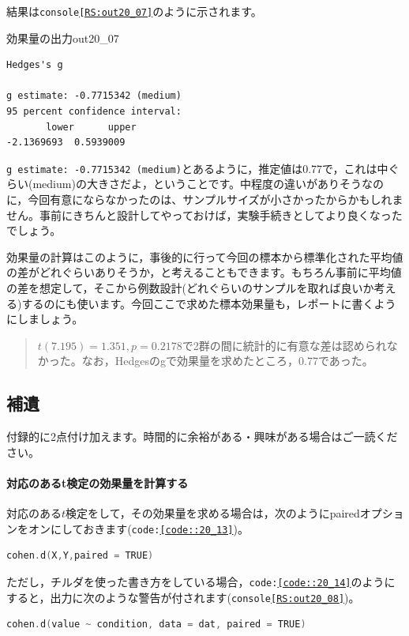 \documentclass{ltjsbook}
\begin{document}
結果は\texttt{console\ref{RS:out20_07}}のように示されます。
\begin{Rscreen}{効果量の出力}{out20_07}
\begin{verbatim}
Hedges's g

g estimate: -0.7715342 (medium)
95 percent confidence interval:
       lower      upper 
-2.1369693  0.5939009 
\end{verbatim}
\end{Rscreen}

\texttt{g estimate: -0.7715342 (medium)}とあるように，推定値は0.77で，これは中ぐらい(medium)の大きさだよ，ということです。中程度の違いがありそうなのに，今回有意にならなかったのは、サンプルサイズが小さかったからかもしれません。事前にきちんと設計してやっておけば，実験手続きとしてより良くなったでしょう。

効果量の計算はこのように，事後的に行って今回の標本から標準化された平均値の差がどれぐらいありそうか，と考えることもできます。もちろん事前に平均値の差を想定して，そこから例数設計(どれぐらいのサンプルを取れば良いか考える)するのにも使います。今回ここで求めた標本効果量も，レポートに書くようにしましょう。

\begin{quote}
    $t(7.195)=1.351,p = 0.2178$で2群の間に統計的に有意な差は認められなかった。なお，Hedgesのgで効果量を求めたところ，0.77であった。
\end{quote}

\subsection{補遺}
付録的に2点付け加えます。時間的に余裕がある・興味がある場合はご一読ください。
\paragraph{対応のあるt検定の効果量を計算する}対応のある$t$検定をして，その効果量を求める場合は，次のようにpairedオプションをオンにしておきます(\texttt{code:\ref{code::20_13}})。

\begin{lstlisting}[language=c++,label={code::20_13},caption={cohenのd}]
cohen.d(X,Y,paired = TRUE)
\end{lstlisting}
ただし，チルダを使った書き方をしている場合，\texttt{code:\ref{code::20_14}}のようにすると，出力に次のような警告が付されます(\texttt{console\ref{RS:out20_08}})。
\begin{lstlisting}[language=c++,label={code::20_14},caption={cohenのdその2}]
cohen.d(value ~ condition, data = dat, paired = TRUE)
\end{lstlisting}
\end{document}
